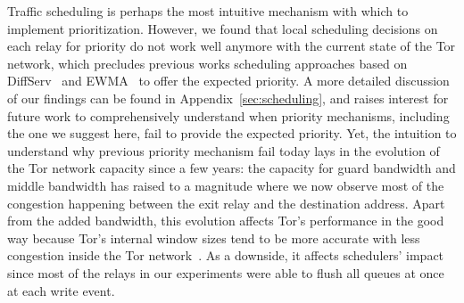 Traffic scheduling is
perhaps the most intuitive mechanism with which to implement
prioritization. However, we found that local scheduling decisions on each relay for priority do not work well anymore with the current state of the Tor network, which precludes previous works scheduling approaches based on DiffServ~\cite{dovrolis1999case} and EWMA~\cite{tang2010improved} to offer the expected priority. A more detailed
discussion of our findings can be found in Appendix~\ref{sec:scheduling}, and raises interest for future work to comprehensively understand when priority mechanisms, including the one we suggest here, fail to provide the expected priority. Yet, the intuition to understand why previous priority mechanism fail today lays in the evolution of the Tor network capacity since a few years: the capacity for guard bandwidth and middle bandwidth has raised to a magnitude where we now observe most of the congestion happening between the exit relay and the destination address. Apart from the added bandwidth, this evolution affects Tor's performance in the good way because Tor's internal window sizes tend to be more accurate with less congestion inside the Tor network~\cite{archive-2009-mail,kiraly2008solving}. As a downside, it affects schedulers' impact since most of the relays in our experiments were able to flush all queues at once at each write event.

